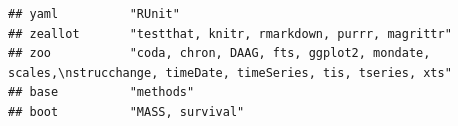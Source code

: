 \documentclass[]{article}
\begin{document}
\begin{verbatim}
## yaml          "RUnit"                                                                                                                                                                                                                                                                                                                                                                                                                                                                                                                                                                                   
## zeallot       "testthat, knitr, rmarkdown, purrr, magrittr"                                                                                                                                                                                                                                                                                                                                                                                                                                                                                                                                             
## zoo           "coda, chron, DAAG, fts, ggplot2, mondate, scales,\nstrucchange, timeDate, timeSeries, tis, tseries, xts"                                                                                                                                                                                                                                                                                                                                                                                                                                                                                 
## base          "methods"                                                                                                                                                                                                                                                                                                                                                                                                                                                                                                                                                                                 
## boot          "MASS, survival"                                                                                                                                                                                                                                                                                                                                                                                                                                                                                                                                                                          

\end{verbatim}
\end{document}
